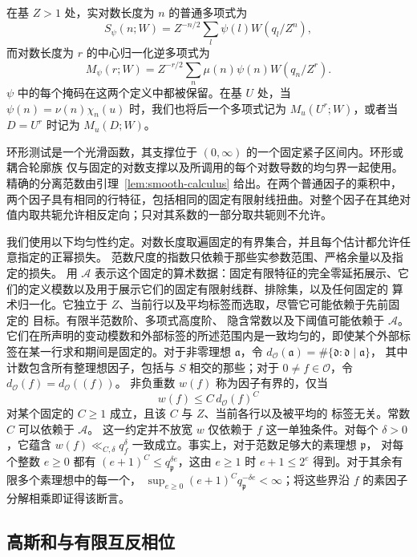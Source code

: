 \documentclass[11pt,a4paper]{article}
\numberwithin{equation}{section}
\numberwithin{figure}{section}
\theoremstyle{definition}
\theoremstyle{remark}
\begin{document}
在基 $Z>1$ 处，实对数长度为 $n$ 的普通多项式为
\begin{equation}
 S_\psi(n;W)=Z^{-n/2}\sum_l\psi(l)W(q_l/Z^n),
 \label{old-eq:1.1}
\end{equation}
而对数长度为 $r$ 的中心归一化逆多项式为
\begin{equation}
 M_\psi(r;W)=Z^{-r/2}\sum_n\mu(n)\psi(n)W(q_n/Z^r).
 \label{old-eq:1.1a}
\end{equation}
$\psi$ 中的每个掩码在这两个定义中都被保留。在基 $U$ 处，当
$\psi(n)=\nu(n)\chi_n(u)$ 时，我们也将后一个多项式记为 $M_u(U^r;W)$，或者当 $D=U^r$ 时记为 $M_u(D;W)$。

环形测试是一个光滑函数，其支撑位于 $(0,\infty)$ 的一个固定紧子区间内。环形或耦合轮廓族
仅与固定的对数支撑以及所调用的每个对数导数的均匀界一起使用。精确的分离范数由引理~\ref{lem:smooth-calculus} 给出。在两个普通因子的乘积中，
两个因子具有相同的行特征，包括相同的固定有限射线扭曲。对整个因子在其绝对值内取共轭允许相反定向；只对其系数的一部分取共轭则不允许。

我们使用以下均匀性约定。对数长度取遍固定的有界集合，并且每个估计都允许任意指定的正幂损失。
范数尺度的指数只依赖于那些实参数范围、严格余量以及指定的损失。
用 $\mathcal A$ 表示这个固定的算术数据：固定有限特征的完全零延拓展示、它们的定义模数以及用于展示它们的固定有限射线群、排除集，以及任何固定的
算术归一化。它独立于 $Z$、当前行以及平均标签而选取，尽管它可能依赖于先前固定的
目标。有限半范数阶、多项式高度阶、
隐含常数以及下阈值可能依赖于 $\mathcal A$。它们在所声明的变动模数和外部标签的所述范围内是一致均匀的，即使某个外部标签在某一行求和期间是固定的。对于非零理想 $\mathfrak a$，令
$d_{\mathcal O}(\mathfrak a)=\#\{\mathfrak d:\mathfrak d\mid\mathfrak a\}$，
其中计数包含所有整理想因子，包括与
$S$ 相交的那些；对于 $0\ne f\in\mathcal O$，令
$d_{\mathcal O}(f)=d_{\mathcal O}((f))$。
非负重数 $w(f)$ 称为因子有界的，仅当
\[
 w(f)\le C\,d_{\mathcal O}(f)^C
\]
对某个固定的 $C\ge1$ 成立，且该 $C$ 与 $Z$、当前各行以及被平均的
标签无关。常数 $C$ 可以依赖于 $\mathcal A$。
这一约定并不放宽 $w$ 仅依赖于
$f$ 这一单独条件。对每个 $\delta>0$，它蕴含 $w(f)\ll_{C,\delta}q_f^\delta$
一致成立。事实上，对于范数足够大的素理想 $\mathfrak p$，
对每个整数 $e\ge0$ 都有 $(e+1)^C\le q_{\mathfrak p}^{\delta e}$，这由
$e\ge1$ 时 $e+1\le2^e$ 得到。对于其余有限多个素理想中的每一个，
$\sup_{e\ge0}(e+1)^Cq_{\mathfrak p}^{-\delta e}<\infty$；将这些界沿
$f$ 的素因子分解相乘即证得该断言。

\subsection{高斯和与有限互反相位}
\end{document}

